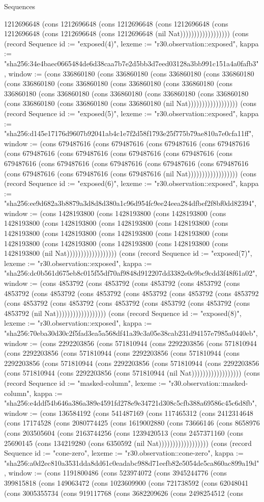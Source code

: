 \begin{lexlean}{Sequences}
\begin{semanticmodule}
{1212696648 (cons 1212696648 (cons 1212696648 (cons 1212696648 (cons 1212696648 (cons 1212696648 (cons 1212696648 (nil Nat)))))))))))))))))}) (cons (record Sequence {id := "exposed(4)", lexeme := "r30.observation::exposed", kappa := "sha256:34e4baec0665484de6d38caa7b7e2d5bb3d7eed03128a3bb991c151a4a0fafb3", window := (cons 336860180 (cons 336860180 (cons 336860180 (cons 336860180 (cons 336860180 (cons 336860180 (cons 336860180 (cons 336860180 (cons 336860180 (cons 336860180 (cons 336860180 (cons 336860180 (cons 336860180 (cons 336860180 (cons 336860180 (cons 336860180 (nil Nat)))))))))))))))))}) (cons (record Sequence {id := "exposed(5)", lexeme := "r30.observation::exposed", kappa := "sha256:d145e17176d9607b92041ab4c1e7f2d58f1793e25f775b79ae810a7e0cfa11ff", window := (cons 679487616 (cons 679487616 (cons 679487616 (cons 679487616 (cons 679487616 (cons 679487616 (cons 679487616 (cons 679487616 (cons 679487616 (cons 679487616 (cons 679487616 (cons 679487616 (cons 679487616 (cons 679487616 (cons 679487616 (cons 679487616 (nil Nat)))))))))))))))))}) (cons (record Sequence {id := "exposed(6)", lexeme := "r30.observation::exposed", kappa := "sha256:ee9d682a3b8879a3d8d8d380a1c96d954fc9ee24eea284dfbef2f8bf0dd82394", window := (cons 1428193800 (cons 1428193800 (cons 1428193800 (cons 1428193800 (cons 1428193800 (cons 1428193800 (cons 1428193800 (cons 1428193800 (cons 1428193800 (cons 1428193800 (cons 1428193800 (cons 1428193800 (cons 1428193800 (cons 1428193800 (cons 1428193800 (cons 1428193800 (nil Nat)))))))))))))))))}) (cons (record Sequence {id := "exposed(7)", lexeme := "r30.observation::exposed", kappa := "sha256:dc0b561d675eb8c015f55df70af9848d912207dd3382e0e9bc9cdd3f48f61a02", window := (cons 4853792 (cons 4853792 (cons 4853792 (cons 4853792 (cons 4853792 (cons 4853792 (cons 4853792 (cons 4853792 (cons 4853792 (cons 4853792 (cons 4853792 (cons 4853792 (cons 4853792 (cons 4853792 (cons 4853792 (cons 4853792 (nil Nat)))))))))))))))))}) (cons (record Sequence {id := "exposed(8)", lexeme := "r30.observation::exposed", kappa := "sha256:70eba30d30c2f5fad3ea5a568df41a39c3a05e38cab231d94157e7985a0440eb", window := (cons 2292203856 (cons 571810944 (cons 2292203856 (cons 571810944 (cons 2292203856 (cons 571810944 (cons 2292203856 (cons 571810944 (cons 2292203856 (cons 571810944 (cons 2292203856 (cons 571810944 (cons 2292203856 (cons 571810944 (cons 2292203856 (cons 571810944 (nil Nat)))))))))))))))))}) (cons (record Sequence {id := "masked-column", lexeme := "r30.observation::masked-column", kappa := "sha256:e4ddf54b646a386a389e4591fd278e9e34721d308c5cfb388a69586c45c6d8fb", window := (cons 136584192 (cons 541487169 (cons 117465312 (cons 2412314648 (cons 17174528 (cons 2080774425 (cons 1619002880 (cons 73666146 (cons 8658976 (cons 203505604 (cons 2163744256 (cons 1239420513 (cons 2457371160 (cons 25690145 (cons 134219280 (cons 6350592 (nil Nat)))))))))))))))))}) (cons (record Sequence {id := "cone-zero", lexeme := "r30.observation::cone-zero", kappa := "sha256:a0d2ec810a3531dda8dd61c0eadabc988d71eefb82e5054de5ca860ac899a19d", window := (cons 1191800486 (cons 523974072 (cons 3945244776 (cons 399815818 (cons 149063472 (cons 1023609900 (cons 721738592 (cons 62048041 (cons 3005355734 (cons 919117768 (cons 3682209626 (cons 2498254512 (cons }
\end{semanticmodule}
\end{lexlean}
